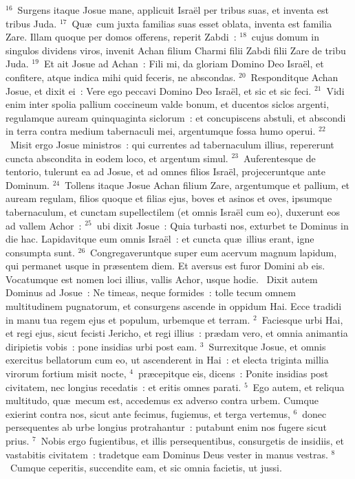 ${}^{16}$~Surgens itaque Josue mane, applicuit Isra\"el per tribus suas, et inventa est tribus Juda.
${}^{17}$~Qu\ae\ cum juxta familias suas esset oblata, inventa est familia Zare. Illam quoque per domos offerens, reperit Zabdi~:
${}^{18}$~cujus domum in singulos dividens viros, invenit Achan filium Charmi filii Zabdi filii Zare de tribu Juda.
${}^{19}$~Et ait Josue ad Achan~: Fili mi, da gloriam Domino Deo Isra\"el, et confitere, atque indica mihi quid feceris, ne abscondas.
${}^{20}$~Responditque Achan Josue, et dixit ei~: Vere ego peccavi Domino Deo Isra\"el, et sic et sic feci.
${}^{21}$~Vidi enim inter spolia pallium coccineum valde bonum, et ducentos siclos argenti, regulamque auream quinquaginta siclorum~: et concupiscens abstuli, et abscondi in terra contra medium tabernaculi mei, argentumque fossa humo operui.
${}^{22}$~Misit ergo Josue ministros~: qui currentes ad tabernaculum illius, repererunt cuncta abscondita in eodem loco, et argentum simul.
${}^{23}$~Auferentesque de tentorio, tulerunt ea ad Josue, et ad omnes filios Isra\"el, projeceruntque ante Dominum.
${}^{24}$~Tollens itaque Josue Achan filium Zare, argentumque et pallium, et auream regulam, filios quoque et filias ejus, boves et asinos et oves, ipsumque tabernaculum, et cunctam supellectilem (et omnis Isra\"el cum eo), duxerunt eos ad vallem Achor~:
${}^{25}$~ubi dixit Josue~: Quia turbasti nos, exturbet te Dominus in die hac. Lapidavitque eum omnis Isra\"el~: et cuncta qu\ae\ illius erant, igne consumpta sunt.
${}^{26}$~Congregaveruntque super eum acervum magnum lapidum, qui permanet usque in pr\ae sentem diem. Et aversus est furor Domini ab eis. Vocatumque est nomen loci illius, vallis Achor, usque hodie.
~\lettrine[lines=10,image=true,loversize=0.05,lraise=-0.03]{D}{}ixit autem Dominus ad Josue~: Ne timeas, neque formides~: tolle tecum omnem multitudinem pugnatorum, et consurgens ascende in oppidum Hai. Ecce tradidi in manu tua regem ejus et populum, urbemque et terram.
${}^{2}$~Faciesque urbi Hai, et regi ejus, sicut fecisti Jericho, et regi illius~: pr\ae dam vero, et omnia animantia diripietis vobis~: pone insidias urbi post eam.
${}^{3}$~Surrexitque Josue, et omnis exercitus bellatorum cum eo, ut ascenderent in Hai~: et electa triginta millia virorum fortium misit nocte,
${}^{4}$~pr\ae cepitque eis, dicens~: Ponite insidias post civitatem, nec longius recedatis~: et eritis omnes parati.
${}^{5}$~Ego autem, et reliqua multitudo, qu\ae\ mecum est, accedemus ex adverso contra urbem. Cumque exierint contra nos, sicut ante fecimus, fugiemus, et terga vertemus,
${}^{6}$~donec persequentes ab urbe longius protrahantur~: putabunt enim nos fugere sicut prius.
${}^{7}$~Nobis ergo fugientibus, et illis persequentibus, consurgetis de insidiis, et vastabitis civitatem~: tradetque eam Dominus Deus vester in manus vestras.
${}^{8}$~Cumque ceperitis, succendite eam, et sic omnia facietis, ut jussi.


